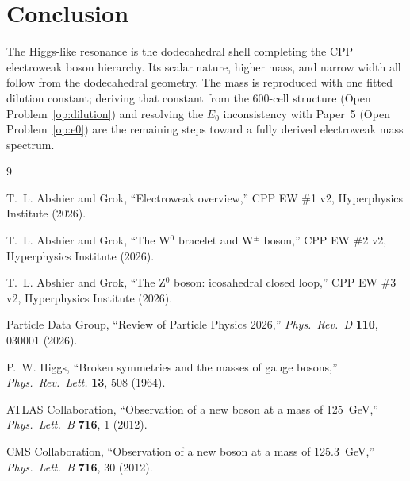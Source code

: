 \documentclass[11pt,a4paper]{article}
\begin{document}
\section{Conclusion}

The Higgs-like resonance is the dodecahedral shell completing the
CPP electroweak boson hierarchy.  Its scalar nature, higher mass, and
narrow width all follow from the dodecahedral geometry.  The mass is
reproduced with one fitted dilution constant; deriving that constant
from the 600-cell structure (Open Problem~\ref{op:dilution}) and
resolving the $E_0$ inconsistency with Paper~5 (Open
Problem~\ref{op:e0}) are the remaining steps toward a fully derived
electroweak mass spectrum.


\begin{thebibliography}{9}

T.~L. Abshier and Grok,
``Electroweak overview,''
CPP EW \#1 v2, Hyperphysics Institute (2026).

T.~L. Abshier and Grok,
``The W$^0$ bracelet and W$^\pm$ boson,''
CPP EW \#2 v2, Hyperphysics Institute (2026).

T.~L. Abshier and Grok,
``The Z$^0$ boson: icosahedral closed loop,''
CPP EW \#3 v2, Hyperphysics Institute (2026).

Particle Data Group,
``Review of Particle Physics 2026,''
\textit{Phys.\ Rev.\ D} \textbf{110}, 030001 (2026).

P.~W. Higgs,
``Broken symmetries and the masses of gauge bosons,''
\textit{Phys.\ Rev.\ Lett.} \textbf{13}, 508 (1964).

ATLAS Collaboration,
``Observation of a new boson at a mass of 125~GeV,''
\textit{Phys.\ Lett.\ B} \textbf{716}, 1 (2012).

CMS Collaboration,
``Observation of a new boson at a mass of 125.3~GeV,''
\textit{Phys.\ Lett.\ B} \textbf{716}, 30 (2012).

\end{thebibliography}
\end{document}
